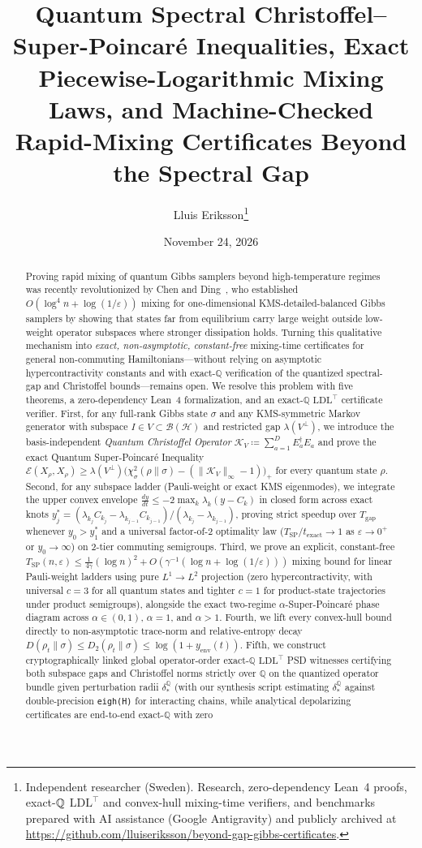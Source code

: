 \documentclass[11pt,a4paper]{article}
\title{\textbf{Quantum Spectral Christoffel--Super-Poincar\'e Inequalities, Exact Piecewise-Logarithmic Mixing Laws, and Machine-Checked Rapid-Mixing Certificates Beyond the Spectral Gap}}
\author{Lluis Eriksson\thanks{Independent researcher (Sweden). Research, zero-dependency Lean~4 proofs, exact-$\Q$ $\mathrm{LDL}^\top$ and convex-hull mixing-time verifiers, and benchmarks prepared with AI assistance (Google Antigravity) and publicly archived at \url{https://github.com/lluiseriksson/beyond-gap-gibbs-certificates}.}}
\date{November 24, 2026}
\theoremstyle{definition}
\newcommand{\Q}{\mathbb{Q}}
\newcommand{\Edir}{\mathcal{E}}
\newcommand{\Kchr}{\mathcal{K}}
\begin{document}
\maketitle

\begin{abstract}
Proving rapid mixing of quantum Gibbs samplers beyond high-temperature regimes was recently revolutionized by Chen and Ding~\cite{ChenDing2026BeyondGap}, who established $O(\log^4 n + \log(1/\varepsilon))$ mixing for one-dimensional KMS-detailed-balanced Gibbs samplers by showing that states far from equilibrium carry large weight outside low-weight operator subspaces where stronger dissipation holds. Turning this qualitative mechanism into \emph{exact, non-asymptotic, constant-free} mixing-time certificates for general non-commuting Hamiltonians---without relying on asymptotic hypercontractivity constants and with exact-$\Q$ verification of the quantized spectral-gap and Christoffel bounds---remains open. We resolve this problem with five theorems, a zero-dependency Lean~4 formalization, and an exact-$\Q$ $\mathrm{LDL}^\top$ certificate verifier. First, for any full-rank Gibbs state $\sigma$ and any KMS-symmetric Markov generator with subspace $I \in V \subset \mathcal{B}(\mathcal{H})$ and restricted gap $\lambda(V^\perp)$, we introduce the basis-independent \emph{Quantum Christoffel Operator} $\Kchr_V \coloneqq \sum_{a=1}^D E_a^\dagger E_a$ and prove the exact Quantum Super-Poincar\'e Inequality $\Edir(X_\rho, X_\rho) \ge \lambda(V^\perp)\bigl(\chi^2_\sigma(\rho\|\sigma) - (\|\Kchr_V\|_\infty - 1)\bigr)_+$ for every quantum state $\rho$. Second, for any subspace ladder (Pauli-weight or exact KMS eigenmodes), we integrate the upper convex envelope $\frac{dy}{dt} \le -2\max_k \lambda_k(y - C_k)$ in closed form across exact knots $y_j^* = (\lambda_{k_j} C_{k_j} - \lambda_{k_{j-1}} C_{k_{j-1}})/(\lambda_{k_j} - \lambda_{k_{j-1}})$, proving strict speedup over $T_{\mathrm{gap}}$ whenever $y_0 > y_1^*$ and a universal factor-of-2 optimality law ($T_{\mathrm{SP}}/t_{\mathrm{exact}} \to 1$ as $\varepsilon \to 0^+$ or $y_0 \to \infty$) on 2-tier commuting semigroups. Third, we prove an explicit, constant-free $T_{\mathrm{SP}}(n,\varepsilon) \le \frac{1}{4\gamma}(\log n)^2 + O(\gamma^{-1}(\log n + \log(1/\varepsilon)))$ mixing bound for linear Pauli-weight ladders using pure $L^1 \to L^2$ projection (zero hypercontractivity, with universal $c=3$ for all quantum states and tighter $c=1$ for product-state trajectories under product semigroups), alongside the exact two-regime $\alpha$-Super-Poincar\'e phase diagram across $\alpha \in (0,1)$, $\alpha = 1$, and $\alpha > 1$. Fourth, we lift every convex-hull bound directly to non-asymptotic trace-norm and relative-entropy decay $D(\rho_t\|\sigma) \le D_2(\rho_t\|\sigma) \le \log(1 + y_{\mathrm{env}}(t))$. Fifth, we construct cryptographically linked global operator-order exact-$\Q$ $\mathrm{LDL}^\top$ PSD witnesses certifying both subspace gaps and Christoffel norms strictly over $\Q$ on the quantized operator bundle given perturbation radii $\delta_*^{\Q}$ (with our synthesis script estimating $\delta_*^{\Q}$ against double-precision \texttt{eigh(H)} for interacting chains, while analytical depolarizing certificates are end-to-end exact-$\Q$ with zero 
\end{abstract}
\end{document}
